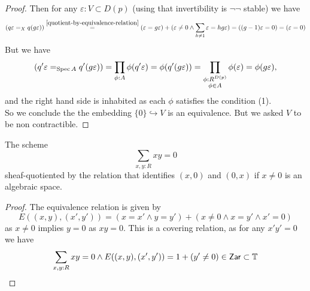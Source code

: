 \begin{proof}
	Then for any $\varepsilon : V \subset D(p)$ (using that invertibility is $\lnot \lnot$ stable) we have
	\begin{align*}
		(q\varepsilon =_X q (g \varepsilon)) \overset{\ref{quotient-by-equivalence-relation}}{=} (\varepsilon = g\varepsilon) + (\varepsilon \neq 0 \land \sum_{h \neq 1} \varepsilon = h g \varepsilon) = ((g-1)\varepsilon = 0) = (\varepsilon = 0)
	\end{align*}
	But we have 
	\[(q' \varepsilon =_{\operatorname{Spec} A} q' (g \varepsilon)) = \prod_{\phi : A} \phi(q' \varepsilon) = \phi(q' (g \varepsilon)) = \prod_{\substack{\phi : R^{D(p)} \\ \phi \in A}} \phi (\varepsilon) = \phi(g \varepsilon) ,\] 
	and the right hand side is inhabited as each $\phi$ satisfies the condition (1). \\
	So we conclude the the embedding $\{0\} \hookrightarrow V$ is an equivalence.  But we asked $V$ to be non contractible.
\end{proof}
\begin{example}
	The scheme 
	\[
	\sum_{x , y : R} x y = 0
	\]
	sheaf-quotiented by the relation that identifies $(x,0)$ and $(0,x)$ if $x \neq 0$ is an algebraic space.
\end{example}
\begin{proof}
	The equivalence relation is given by
	\[
	E((x,y) , (x',y')) = (x = x' \land y = y') + (x \neq 0 \land x = y' \land x' = 0)
	\]
	as $x \neq 0$ implies $y = 0$ as $x y =0$. This is a covering relation, as for any $x' y' = 0$ we have
	\[
	\sum_{x,y : R} x y = 0 \land E((x,y) , (x' , y')) = 1 + (y' \neq 0) \in \mathsf{Zar} \subset \mathbb{T}
	\]		
\end{proof}



